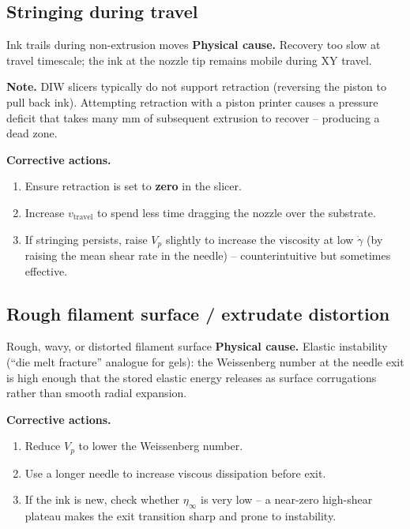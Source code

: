 \documentclass[11pt,a4paper]{article}
\newcommand{\gd}{\dot{\gamma}}
\begin{document}
\subsection{Stringing during travel}

\begin{failurebox}{Ink trails during non-extrusion moves}
\textbf{Physical cause.} Recovery too slow at travel timescale; the
ink at the nozzle tip remains mobile during XY travel.

\textbf{Note.} DIW slicers typically do not support retraction
(reversing the piston to pull back ink). Attempting retraction with
a piston printer causes a pressure deficit that takes many mm of
subsequent extrusion to recover -- producing a dead zone.

\textbf{Corrective actions.}
\begin{enumerate}[leftmargin=1.6em,itemsep=1pt]
\item Ensure retraction is set to \textbf{zero} in the slicer.
\item Increase $v_\mathrm{travel}$ to spend less time dragging the
  nozzle over the substrate.
\item If stringing persists, raise $V_p$ slightly to increase the
  viscosity at low $\gd$ (by raising the mean shear rate in the needle)
  -- counterintuitive but sometimes effective.
\end{enumerate}
\end{failurebox}

\subsection{Rough filament surface / extrudate distortion}

\begin{failurebox}{Rough, wavy, or distorted filament surface}
\textbf{Physical cause.} Elastic instability (``die melt fracture'' analogue for
gels): the Weissenberg number at the needle exit is high enough
that the stored elastic energy releases as surface corrugations rather
than smooth radial expansion.

\textbf{Corrective actions.}
\begin{enumerate}[leftmargin=1.6em,itemsep=1pt]
\item Reduce $V_p$ to lower the Weissenberg number.
\item Use a longer needle to increase viscous dissipation before exit.
\item If the ink is new, check whether $\eta_\infty$ is very low --
  a near-zero high-shear plateau makes the exit transition sharp and
  prone to instability.
\end{enumerate}
\end{failurebox}
\end{document}

